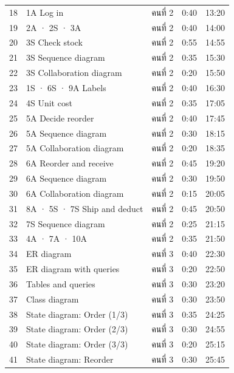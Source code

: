 \documentclass[12pt,a4paper]{article}
\begin{document}
{\begin{tabularx}{\linewidth}{p{0.8cm} X p{2.0cm} p{1.6cm} p{1.8cm}}
18 & 1A Log in & \textcolor{sB}{คนที่ 2} & 0:40 & 13:20\\
19 & 2A · 2S · 3A & \textcolor{sB}{คนที่ 2} & 0:40 & 14:00\\
20 & 3S Check stock & \textcolor{sB}{คนที่ 2} & 0:55 & 14:55\\
21 & 3S Sequence diagram & \textcolor{sB}{คนที่ 2} & 0:35 & 15:30\\
22 & 3S Collaboration diagram & \textcolor{sB}{คนที่ 2} & 0:20 & 15:50\\
23 & 1S · 6S · 9A Labels & \textcolor{sB}{คนที่ 2} & 0:40 & 16:30\\
24 & 4S Unit cost & \textcolor{sB}{คนที่ 2} & 0:35 & 17:05\\
25 & 5A Decide reorder & \textcolor{sB}{คนที่ 2} & 0:40 & 17:45\\
26 & 5A Sequence diagram & \textcolor{sB}{คนที่ 2} & 0:30 & 18:15\\
27 & 5A Collaboration diagram & \textcolor{sB}{คนที่ 2} & 0:20 & 18:35\\
28 & 6A Reorder and receive & \textcolor{sB}{คนที่ 2} & 0:45 & 19:20\\
29 & 6A Sequence diagram & \textcolor{sB}{คนที่ 2} & 0:30 & 19:50\\
30 & 6A Collaboration diagram & \textcolor{sB}{คนที่ 2} & 0:15 & 20:05\\
31 & 8A · 5S · 7S Ship and deduct & \textcolor{sB}{คนที่ 2} & 0:45 & 20:50\\
32 & 7S Sequence diagram & \textcolor{sB}{คนที่ 2} & 0:25 & 21:15\\
33 & 4A · 7A · 10A & \textcolor{sB}{คนที่ 2} & 0:35 & 21:50\\
\midrule
34 & ER diagram & \textcolor{sC}{คนที่ 3} & 0:40 & 22:30\\
35 & ER diagram with queries & \textcolor{sC}{คนที่ 3} & 0:20 & 22:50\\
36 & Tables and queries & \textcolor{sC}{คนที่ 3} & 0:30 & 23:20\\
37 & Class diagram & \textcolor{sC}{คนที่ 3} & 0:30 & 23:50\\
38 & State diagram: Order (1/3) & \textcolor{sC}{คนที่ 3} & 0:35 & 24:25\\
39 & State diagram: Order (2/3) & \textcolor{sC}{คนที่ 3} & 0:30 & 24:55\\
40 & State diagram: Order (3/3) & \textcolor{sC}{คนที่ 3} & 0:20 & 25:15\\
41 & State diagram: Reorder & \textcolor{sC}{คนที่ 3} & 0:30 & 25:45\\

\end{tabularx}}
\end{document}
